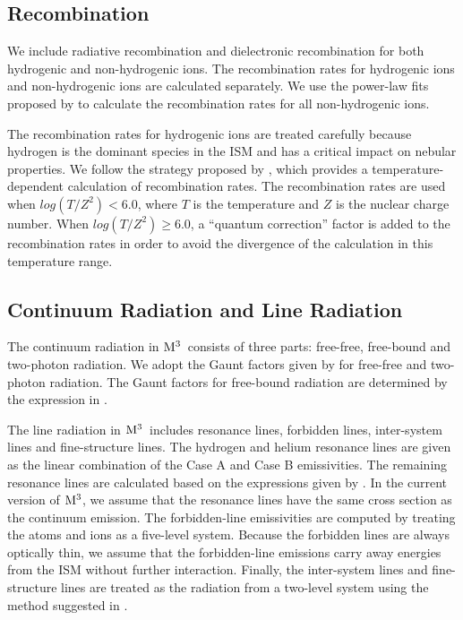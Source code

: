 \documentclass[twocolumn]{aastex62}
\newcommand{\newcode}{{$\rm M^3$}}
\begin{document}
\begin{CJK*}{UTF8}{gbsn}
\subsection{Recombination}

We include radiative recombination and dielectronic recombination for both hydrogenic and non-hydrogenic ions.
The recombination rates for hydrogenic ions and non-hydrogenic ions are calculated separately.
We use the power-law fits proposed by \cite{Aldrovandi-1973} to calculate the recombination rates for all non-hydrogenic ions.

The recombination rates for hydrogenic ions are treated carefully because hydrogen is the dominant species in the ISM and has a critical impact on nebular properties.
We follow the strategy proposed by \cite{Sutherland-1993}, which provides a temperature-dependent calculation of recombination rates.
The \cite{Seaton-1959} recombination rates are used when $log(T/Z^{2}) < 6.0$, where $T$ is the temperature and $Z$ is the nuclear charge number.
When $log(T/Z^{2})\geq 6.0$, a ``quantum correction'' factor \citep{Gaunt-1930} is added to the recombination rates in order to avoid the divergence of the \cite{Seaton-1959} calculation in this temperature range.


\subsection{Continuum Radiation and Line Radiation}

The continuum radiation in \newcode\ consists of three parts: free-free, free-bound and two-photon radiation. 
We adopt the Gaunt factors given by \cite{Gronenschild-1978} for free-free and two-photon radiation.
The Gaunt factors for free-bound radiation are determined by the expression in \cite{Mewe-1986}.

The line radiation in \newcode\ includes resonance lines, forbidden lines, inter-system lines and fine-structure lines.
The hydrogen and helium resonance lines are given as the linear combination of the Case A and Case B emissivities.
The remaining resonance lines are calculated based on the expressions given by \cite{Mewe-1981}.
In the current version of \newcode, we assume that the resonance lines have the same cross section as the continuum emission.
The forbidden-line emissivities are computed by treating the atoms and ions as a five-level system. 
Because the forbidden lines are always optically thin, we assume that the forbidden-line emissions carry away energies from the ISM without further interaction.
Finally, the inter-system lines and fine-structure lines are treated as the radiation from a two-level system using the method suggested in \cite{Binette-1982}.


\end{CJK*}
\end{document}
